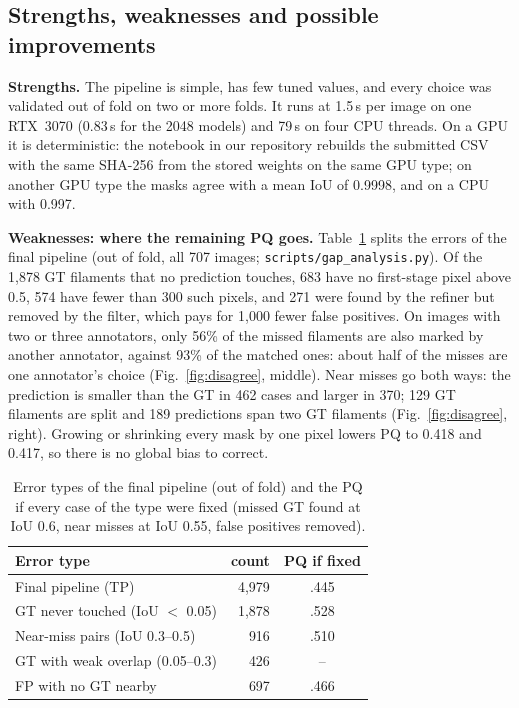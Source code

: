 \documentclass[sigconf]{acmart}
\begin{document}
\subsection{Strengths, weaknesses and possible improvements}
\label{sec:weak}

\textbf{Strengths.} The pipeline is simple, has few tuned values, and every choice was
validated out of fold on two or more folds. It runs at 1.5\,s per image on one RTX~3070
(0.83\,s for the 2048 models) and 79\,s on four CPU threads. On a GPU it is deterministic: the
notebook in our repository rebuilds the submitted CSV with the same SHA-256 from the stored
weights on the same GPU type; on another GPU type the masks agree with a mean IoU of 0.9998,
and on a CPU with 0.997.

\textbf{Weaknesses: where the remaining PQ goes.} Table~\ref{tab:gap} splits the errors of the
final pipeline (out of fold, all 707 images; \texttt{scripts/gap\_analysis.py}). Of the 1,878
GT filaments that no prediction touches, 683 have no first-stage pixel above 0.5, 574 have
fewer than 300 such pixels, and 271 were found by the refiner but removed by the filter, which
pays for 1,000 fewer false positives. On images with two or three annotators, only 56\% of the
missed filaments are also marked by another annotator, against 93\% of the matched ones: about
half of the misses are one annotator's choice (Fig.~\ref{fig:disagree}, middle). Near misses go
both ways: the prediction is smaller than the GT in 462 cases and larger in 370; 129 GT
filaments are split and 189 predictions span two GT filaments (Fig.~\ref{fig:disagree},
right). Growing or shrinking every mask by one pixel lowers PQ to 0.418 and 0.417, so there is
no global bias to correct.

\begin{table}[t]
\caption{Error types of the final pipeline (out of fold) and the PQ if every case of the type
were fixed (missed GT found at IoU 0.6, near misses at IoU 0.55, false positives removed).}
\label{tab:gap}
\centering
\small
\begin{tabular}{lrc}
\toprule
Error type & count & PQ if fixed \\
\midrule
Final pipeline (TP) & 4,979 & .445 \\
GT never touched (IoU $<$ 0.05) & 1,878 & .528 \\
Near-miss pairs (IoU 0.3--0.5) & 916 & .510 \\
GT with weak overlap (0.05--0.3) & 426 & -- \\
FP with no GT nearby & 697 & .466 \\
\bottomrule
\end{tabular}
\end{table}
\end{document}
